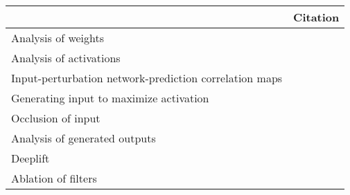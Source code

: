 \begin{tabular}{ll}
\toprule
{} &                                                                                                                                                                                          Citation \\
\midrule
Analysis of weights                                    &  \cite{Perez-Benitez2018, Yoon2018, Langkvist2018, Deiss2018, Lawhern2018, Xu2016, Tsinalis2016a, Nurse2016, Tabar2016a, Zheng2015, Stober2015, Manor2015, Yang2015a, Langkvist2012, Cecotti2011} \\
Analysis of activations                                &                                                                                           \cite{Yuan2018a, Waytowich2018, Lawhern2018, kwak2017, Yin2017a, Supratak2017, Shamwell2016, Manor2015} \\
Input-perturbation network-prediction correlation maps &                                                                                                              \cite{Schirrmeister2017a, Volker2018, Hartmann2018b, Behncke2017, Schirrmeister2017} \\
Generating input to maximize activation                &                                                                                                                                      \cite{VanPutten2018b, Ruffini2018a, Sors2018, Bashivan2016a} \\
Occlusion of input                                     &                                                                                                                                                        \cite{Lee2018, Chambon2018, Thodoroff2016} \\
Analysis of generated outputs                          &                                                                                                                                                                               \cite{Hartmann2018} \\
Deeplift                                               &                                                                                                                                                                                \cite{Lawhern2018} \\
Ablation of filters                                    &                                                                                                                                                                                \cite{Lawhern2018} \\

\end{tabular}
